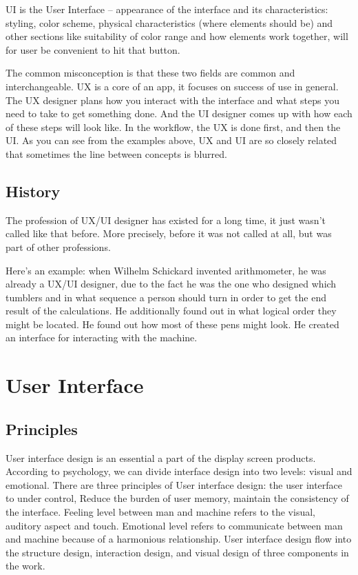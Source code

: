 \documentclass[10pt,twoside,english,a4paper]{article}
\begin{document}
UI is the User Interface – appearance of the interface and its characteristics: styling, color scheme, physical characteristics (where elements should be) and other sections like suitability of color range and how elements work together, will for user be convenient to hit that button. 

The common misconception is that these two fields are common and interchangeable. UX is a core of an app, it focuses on success of use in general. The UX designer plans how you interact with the interface and what steps you need to take to get something done. And the UI designer comes up with how each of these steps will look like. In the workflow, the UX is done first, and then the UI. As you can see from the examples above, UX and UI are so closely related that sometimes the line between concepts is blurred\cite{WhatIsDesign}.

\subsection{History}
The profession of UX/UI designer has existed for a long time, it just wasn't called like that before. More precisely, before it was not called at all, but was part of other professions.

Here’s an example: when Wilhelm Schickard invented arithmometer, he was already a UX/UI designer, due to the fact he was the one who designed which tumblers and in what sequence a person should turn in order to get the end result of the calculations. He additionally found out in what logical order they might be located. He found out how most of these pens might look. He created an interface for interacting with the machine\cite{WhatIsDesign}.



\section{User Interface} \label{UI}
\subsection{Principles} 
User interface design is an essential a part of the display screen products. According to psychology, we can divide interface design into two levels: visual and emotional. There are three principles of User interface design: the user interface to under control, Reduce the burden of user memory, maintain the consistency of the interface. Feeling level between man and machine refers to the visual, auditory aspect and touch. Emotional level refers to communicate between man and machine because of a harmonious relationship. User interface design flow into the structure design, interaction design, and visual design of three components in the work\cite{5681254}.
\end{document}

